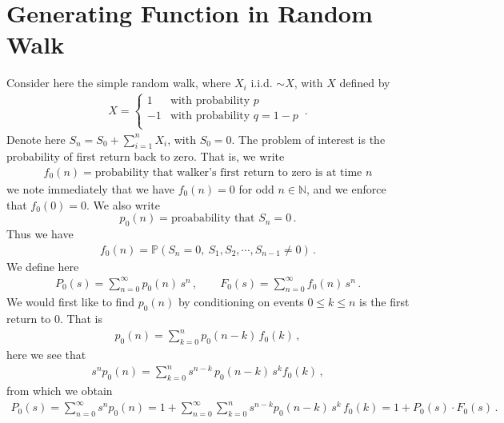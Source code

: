 \documentclass[11pt, onesided]{book}
\theoremstyle{break}
\theoremstyle{break}
\newcommand{\N}{\mathbb{N}}
\newcommand{\example}{\color{green}Example: \color{black}}
\begin{document}

\section[Generating Function in Random Walk]{\color{red} Generating Function in Random Walk\color{black}}
Consider here the simple random walk, where $X_i$ i.i.d. $\sim X$, with $X$ defined by
\begin{align*}
X = \begin{cases} 
1 & \text{with probability }p\\
-1 & \text{with probability }q = 1-p\\
\end{cases}\,.
\end{align*}
Denote here $S_n = S_0 + \sum_{i=1}^n X_i$, with $S_0 = 0$. The problem of interest is the probability of first return back to zero. That is, we write
\begin{align*}
f_0(n) = \text{probability that walker's first return to zero is at time }n
\end{align*}
we note immediately that we have $f_0(n) = 0$ for odd $n \in \N$, and we enforce that $f_0(0) = 0$. We also write 
$$p_0(n) = \text{proabability that }S_n = 0\,.$$
Thus we have 
\begin{align*}
f_0(n) = \mathbb{P}(S_n =0,\ S_1,S_2,\cdots,S_{n-1}\neq 0)\,.
\end{align*}
We define here
\begin{align*}
P_0(s) = \sum_{n=0}^\infty p_0(n) \, s^n \,,\qquad
F_0(s) = \sum_{n=0}^\infty f_0(n) \, s^n\,.
\end{align*}
We would first like to find $p_0(n)$ by conditioning on events $0\leq k \leq n$ is the first return to $0$. That is
\begin{align*}
p_0(n) = \sum_{k=0}^n p_0(n-k)\, f_0(k)\,,
\end{align*}
here we see that
\begin{align*}
s^n p_0(n) = \sum_{k=0}^n s^{n-k}\,p_0(n-k)\, s^k f_0(k)\,,
\end{align*}
from which we obtain
\begin{align*}
P_0(s) = \sum_{n=0}^\infty s^n p_0(n) = 1 + \sum_{n=0}^\infty \sum_{k=0}^n s^{n-k}p_0(n-k)\, s^k\, f_0(k) = 1+ P_0(s) \cdot F_0(s)\,.
\end{align*}
\end{document}
